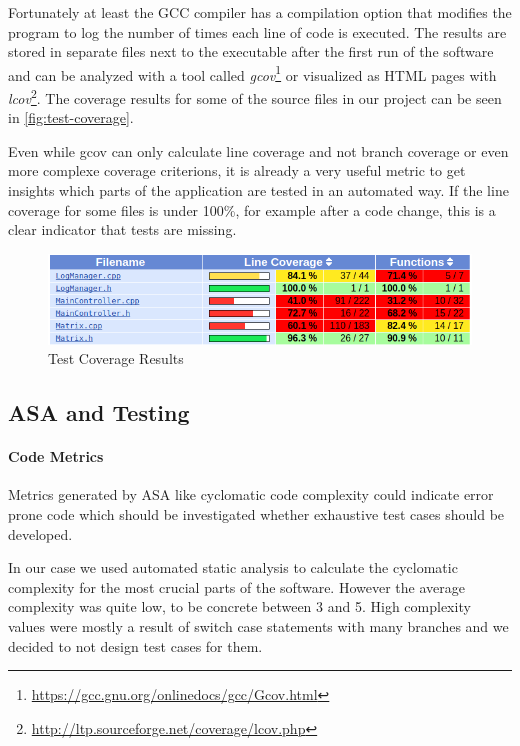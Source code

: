 \documentclass{scrreprt}
\begin{document}
Fortunately at least the GCC compiler has a compilation option that modifies the program to log the number of times each line of code is executed. The results are stored in separate files next to the executable after the first run of the software and can be analyzed with a tool called \textit{gcov}\footnote{\url{https://gcc.gnu.org/onlinedocs/gcc/Gcov.html}} or visualized as HTML pages with \textit{lcov}\footnote{\url{http://ltp.sourceforge.net/coverage/lcov.php}}. The coverage results for some of the source files in our project can be seen in \vref{fig:test-coverage}.

Even while gcov can only calculate line coverage and not branch coverage or even more complexe coverage criterions, it is already a very useful metric to get insights which parts of the application are tested in an automated way. If the line coverage for some files is under 100\%, for example after a code change, this is a clear indicator that tests are missing.

\begin{figure}[h]
	\centering
	\includegraphics[width=1.0\textwidth]{img/test-coverage}
	\caption[Test Coverage Results]{Test Coverage Results}
	\label{fig:test-coverage}
\end{figure}

\subsection{ASA and Testing}

\paragraph{Code Metrics} Metrics generated by ASA like cyclomatic code complexity could indicate error prone code which should be investigated whether exhaustive test cases should be developed.

In our case we used automated static analysis to calculate the cyclomatic complexity for the most crucial parts of the software. However the average complexity was quite low, to be concrete between 3 and 5. High complexity values were mostly a result of switch case statements with many branches and we decided to not design test cases for them.
\end{document}
